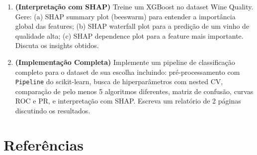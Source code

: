 \documentclass[12pt,a4paper]{article}
\begin{document}
\begin{enumerate}[leftmargin=2em,label=\textcolor{mineblue}{\textbf{E\arabic*.}}]
  \item \textbf{(Interpretação com SHAP)} Treine um XGBoost no dataset Wine Quality. Gere: (a) SHAP summary plot (beeswarm) para entender a importância global das features; (b) SHAP waterfall plot para a predição de um vinho de qualidade alta; (c) SHAP dependence plot para a feature mais importante. Discuta os insights obtidos.

  \item \textbf{(Implementação Completa)} Implemente um pipeline de classificação completo para o dataset de sua escolha incluindo: pré-processamento com \texttt{Pipeline} do scikit-learn, busca de hiperparâmetros com nested CV, comparação de pelo menos 5 algoritmos diferentes, matriz de confusão, curvas ROC e PR, e interpretação com SHAP. Escreva um relatório de 2 páginas discutindo os resultados.

\end{enumerate}

\section{Referências}
\end{document}
